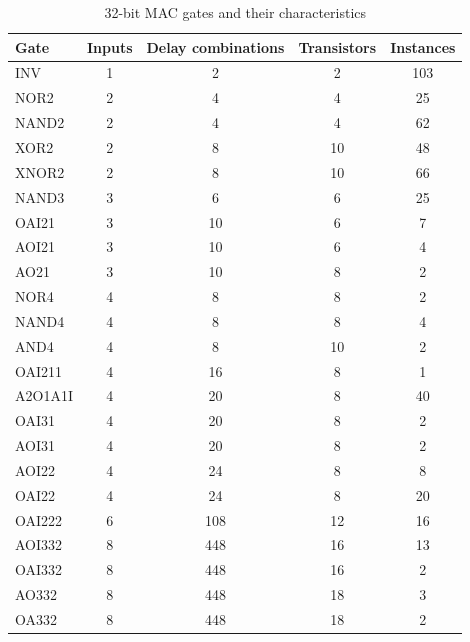 \begin{table}
	\caption{32-bit MAC gates and their characteristics}
	\begin{center}
		\begin{tabular}{lcccc} \toprule
			Gate & Inputs & Delay combinations & Transistors & Instances \\ \midrule
			INV & 1 & 2 & 2 & 103 \\
			NOR2 & 2 & 4 & 4 & 25 \\
			NAND2 & 2 & 4 & 4 & 62 \\
			XOR2 & 2 & 8 & 10 & 48 \\
			XNOR2 & 2 & 8 & 10 & 66 \\
			NAND3 & 3 & 6 & 6 & 25 \\
			OAI21 & 3 & 10 & 6 & 7 \\
			AOI21 & 3 & 10 & 6 & 4 \\
			AO21 & 3 & 10 & 8 & 2 \\
			NOR4 & 4 & 8 & 8 & 2 \\
			NAND4 & 4 & 8 & 8 & 4 \\
			AND4 & 4 & 8 & 10 & 2 \\
			OAI211 & 4 & 16 & 8 & 1 \\
			A2O1A1I & 4 & 20 & 8 & 40 \\
			OAI31 & 4 & 20 & 8 & 2 \\
			AOI31 & 4 & 20 & 8 & 2 \\
			AOI22 & 4 & 24 & 8 & 8 \\
			OAI22 & 4 & 24 & 8 & 20 \\
			OAI222 & 6 & 108 & 12 & 16 \\
			AOI332 & 8 & 448 & 16 & 13 \\
			OAI332 & 8 & 448 & 16 & 2 \\
			AO332 & 8 & 448 & 18 & 3 \\
			OA332 & 8 & 448 & 18 & 2 \\ \bottomrule
		\end{tabular}
	\end{center}
	\label{table:gates}
\end{table}


